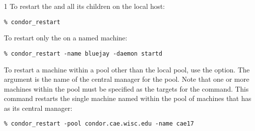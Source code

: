 \begin{ManPage}{\label{man-condor-restart}}{1}
\Examples
To restart the  and all its children
on the local host:
\begin{verbatim}
% condor_restart
\end{verbatim}

To restart only the  on a named machine:
\begin{verbatim}
% condor_restart -name bluejay -daemon startd
\end{verbatim}

To restart a machine within a pool
other than the local pool, use the  option.
The argument is the name of the central manager for the pool.
Note that one or more machines within the pool must be
specified as the targets for the command.
This command restarts
the single machine named  within the
pool of machines that has  as
its central manager:
\begin{verbatim}
% condor_restart -pool condor.cae.wisc.edu -name cae17
\end{verbatim}

\end{ManPage}
